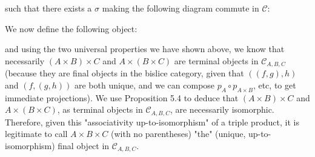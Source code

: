 such that there exists a $\sigma$ making the following diagram commute in $\mathcal{C}$:


We now define the following object:


and using the two universal properties we have shown above, we know that necessarily $(A \times B) \times C$ and $A \times (B \times C)$ are terminal objects in $\mathcal{C}_{A,B,C}$ (because they are final objects in the bislice category, given that $((f,g),h)$ and $(f,(g,h))$ are both unique, and we can compose $p_A \circ p_{A \times B}$, etc, to get immediate projections). We use Proposition 5.4 to deduce that $(A \times B) \times C$ and $A \times (B \times C)$, as terminal objects in $\mathcal{C}_{A,B,C}$, are necessarily isomorphic. Therefore, given this "associativity up-to-isomorphism" of a triple product, it is legitimate to call $A \times B \times C$ (with no parentheses) "the" (unique, up-to-isomorphism) final object in $\mathcal{C}_{A,B,C}$.



